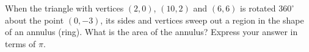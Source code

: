 When the triangle with vertices $(2,0)$, $(10,2)$ and $(6,6)$ is rotated $360^\circ$ about the point $(0,-3)$, its sides and vertices sweep out a region in the shape of an annulus (ring). What is the area of the annulus? Express your answer in terms of $\pi$.
